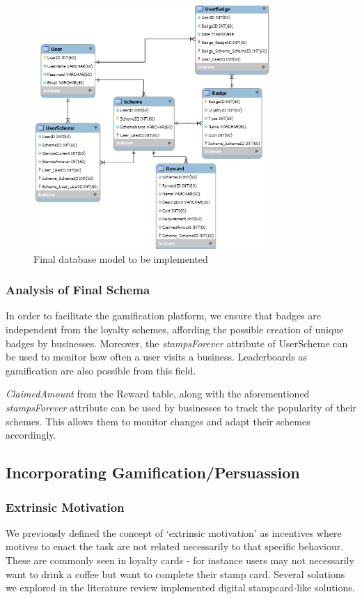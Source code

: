 \begin{figure}[H]
  \centering
    \includegraphics[width=0.8\textwidth]{img/architecture.png}
      \caption{Final database model to be implemented}
      \label{fig:finaldb}
\end{figure}

\subsubsection{Analysis of Final Schema}
In order to facilitate the gamification platform, we ensure that badges are independent from the loyalty schemes, affording the possible creation of unique badges by businesses. Moreover, the \emph{stampsForever} attribute of UserScheme can be used to monitor how often a user visits a business. Leaderboards as gamification are also possible from this field.

\emph{ClaimedAmount} from the Reward table, along with the aforementioned \emph{stampsForever} attribute can be used by businesses to track the popularity of their schemes. This allows them to monitor changes and adapt their schemes accordingly.

\newpage
\subsection{Incorporating Gamification/Persuassion}
\subsubsection{Extrinsic Motivation}
We previously defined the concept of `extrinsic motivation' as incentives where motives to enact the task are not related necessarily to that specific behaviour. These are commonly seen in loyalty cards - for instance users may not necessarily want to drink a coffee but want to complete their stamp card. Several solutions we explored in the literature review implemented digital stampcard-like solutions.

